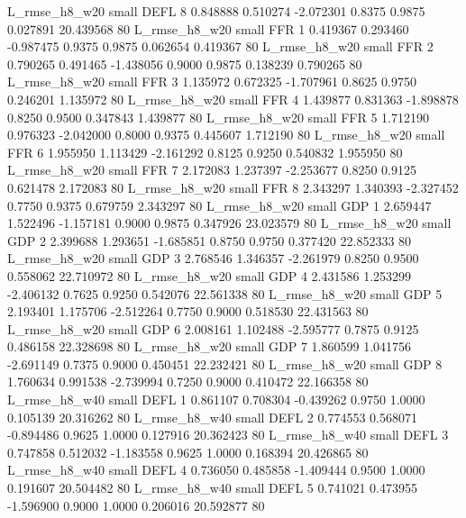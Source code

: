  L_rmse_h8_w20      small     DEFL                 8 0.848888 0.510274 -2.072301 0.8375 0.9875  0.027891   20.439568 80
 L_rmse_h8_w20      small      FFR                 1 0.419367 0.293460 -0.987475 0.9375 0.9875  0.062654    0.419367 80
 L_rmse_h8_w20      small      FFR                 2 0.790265 0.491465 -1.438056 0.9000 0.9875  0.138239    0.790265 80
 L_rmse_h8_w20      small      FFR                 3 1.135972 0.672325 -1.707961 0.8625 0.9750  0.246201    1.135972 80
 L_rmse_h8_w20      small      FFR                 4 1.439877 0.831363 -1.898878 0.8250 0.9500  0.347843    1.439877 80
 L_rmse_h8_w20      small      FFR                 5 1.712190 0.976323 -2.042000 0.8000 0.9375  0.445607    1.712190 80
 L_rmse_h8_w20      small      FFR                 6 1.955950 1.113429 -2.161292 0.8125 0.9250  0.540832    1.955950 80
 L_rmse_h8_w20      small      FFR                 7 2.172083 1.237397 -2.253677 0.8250 0.9125  0.621478    2.172083 80
 L_rmse_h8_w20      small      FFR                 8 2.343297 1.340393 -2.327452 0.7750 0.9375  0.679759    2.343297 80
 L_rmse_h8_w20      small      GDP                 1 2.659447 1.522496 -1.157181 0.9000 0.9875  0.347926   23.023579 80
 L_rmse_h8_w20      small      GDP                 2 2.399688 1.293651 -1.685851 0.8750 0.9750  0.377420   22.852333 80
 L_rmse_h8_w20      small      GDP                 3 2.768546 1.346357 -2.261979 0.8250 0.9500  0.558062   22.710972 80
 L_rmse_h8_w20      small      GDP                 4 2.431586 1.253299 -2.406132 0.7625 0.9250  0.542076   22.561338 80
 L_rmse_h8_w20      small      GDP                 5 2.193401 1.175706 -2.512264 0.7750 0.9000  0.518530   22.431563 80
 L_rmse_h8_w20      small      GDP                 6 2.008161 1.102488 -2.595777 0.7875 0.9125  0.486158   22.328698 80
 L_rmse_h8_w20      small      GDP                 7 1.860599 1.041756 -2.691149 0.7375 0.9000  0.450451   22.232421 80
 L_rmse_h8_w20      small      GDP                 8 1.760634 0.991538 -2.739994 0.7250 0.9000  0.410472   22.166358 80
 L_rmse_h8_w40      small     DEFL                 1 0.861107 0.708304 -0.439262 0.9750 1.0000  0.105139   20.316262 80
 L_rmse_h8_w40      small     DEFL                 2 0.774553 0.568071 -0.894486 0.9625 1.0000  0.127916   20.362423 80
 L_rmse_h8_w40      small     DEFL                 3 0.747858 0.512032 -1.183558 0.9625 1.0000  0.168394   20.426865 80
 L_rmse_h8_w40      small     DEFL                 4 0.736050 0.485858 -1.409444 0.9500 1.0000  0.191607   20.504482 80
 L_rmse_h8_w40      small     DEFL                 5 0.741021 0.473955 -1.596900 0.9000 1.0000  0.206016   20.592877 80
